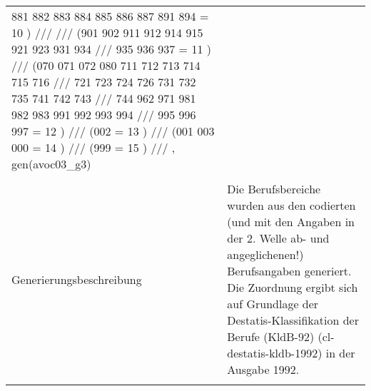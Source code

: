 \begin{tabular}{lL{11.3cm}}
881 882 883 884 885 886 887 891 894 = 10 ) ///  ///
(901 902 911 912 914 915 921 923 931 934 ///
935 936 937 = 11 ) ///
(070 071 072 080 711 712 713 714 715 716 ///
721 723 724 726 731 732 735 741 742 743 ///
744 962 971 981 982 983 991 992 993 994 ///
995 996 997 = 12 ) ///
(002 = 13 ) ///
(001 003 000 = 14 ) ///
(999 = 15 ) ///
, gen(avoc03\_g3) 
 \\
				 \\
					Generierungsbeschreibung & Die Berufsbereiche wurden aus den codierten (und mit den Angaben in der 2. Welle ab- und angeglichenen!) Berufsangaben generiert. Die Zuordnung ergibt sich auf Grundlage der Destatis-Klassifikation der Berufe (KldB-92) (cl-destatis-kldb-1992) in der Ausgabe 1992. 
				 \\	
			 \\
		\end{tabular}






	
	\newpage
